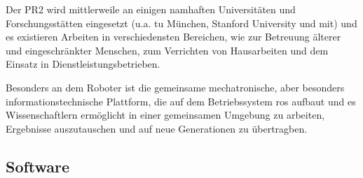 Der PR2 wird mittlerweile an einigen namhaften Universitäten und Forschungsstätten eingesetzt
 (u.a. \gls{tu} München, Stanford University und \gls{mit}) und es existieren Arbeiten in verschiedensten Bereichen,
 wie zur Betreuung älterer und eingeschränkter Menschen, zum Verrichten von Hausarbeiten  und dem Einsatz
 in Dienstleistungsbetrieben.

Besonders an dem Roboter ist die gemeinsame mechatronische, aber besonders informationstechnische Plattform,
 die auf dem Betriebssystem \gls{ros} aufbaut und es Wissenschaftlern
 ermöglicht in einer gemeinsamen Umgebung zu arbeiten, Ergebnisse auszutauschen und auf neue Generationen zu übertragben.

\subsection{Software}


